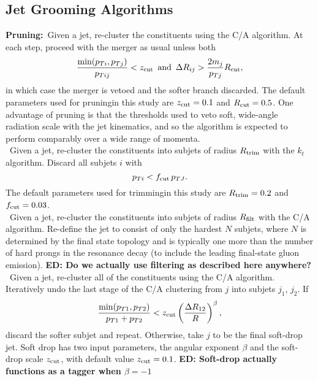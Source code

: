 \subsection{Jet Grooming Algorithms}
\label{sec:groomers}

 {\bf Pruning:}~Given a jet, re-cluster the constituents using the C/A algorithm. At each step, proceed with the merger as usual unless both
 \begin{equation}
 \frac{\mathrm{min}(p_{Ti},p_{Tj})}{p_{Tij}} < z_{\rm cut}\,\,\,\mathrm{and}\,\,\,\Delta R_{ij} > \frac{2m_j}{p_{Tj}} R_{\rm cut},
 \end{equation}
 in which case the merger is vetoed and the softer branch  discarded. The default parameters used for pruning in this study are $z_{\rm cut}=0.1$ and $R_{\rm cut}=0.5$. One advantage of pruning is that the thresholds used
 to veto soft, wide-angle radiation scale with the jet kinematics, and so the algorithm is expected to perform comparably over a wide range of momenta.\\

 ~Given a jet, re-cluster the constituents into subjets of radius $R_{\rm trim}$ with the $k_t$ algorithm. Discard all subjets $i$ with 
 \begin{equation}
 p_{Ti} < f_{\rm cut} \, p_{TJ}.
 \end{equation}
 The default parameters used for trimming in this study are $R_{\rm trim}=0.2$ and $f_{\rm cut}=0.03$.\\
 
   ~Given a jet, re-cluster the constituents into subjets of radius $R_{\rm filt}$ with the C/A algorithm. Re-define the jet to consist of only the hardest $N$ subjets, where $N$ is determined by the final state topology and is typically one more than the number of hard prongs in the resonance decay (to include the leading final-state gluon emission). {\bf ED: Do we actually use filtering as described here anywhere?}\\
 
 ~Given a jet, re-cluster all of the constituents using the C/A algorithm. Iteratively undo the last stage of the C/A clustering from $j$ into subjets $j_1$, $j_2$. If
 \begin{equation}
 \frac{\mathrm{min}(p_{T1},p_{T2})}{p_{T1}+p_{T2}} < z_{\rm cut} \left(\frac{\Delta R_{12}}{R}\right)^\beta,
 \end{equation}
 discard the softer subjet and repeat. Otherwise, take $j$ to be the final soft-drop jet. Soft drop has two input parameters, the angular exponent $\beta$ and the soft-drop scale $z_{\rm cut}$, with default value $z_{\rm cut}=0.1$. {\bf ED: Soft-drop actually functions as a tagger when $\beta=-1$}
 


